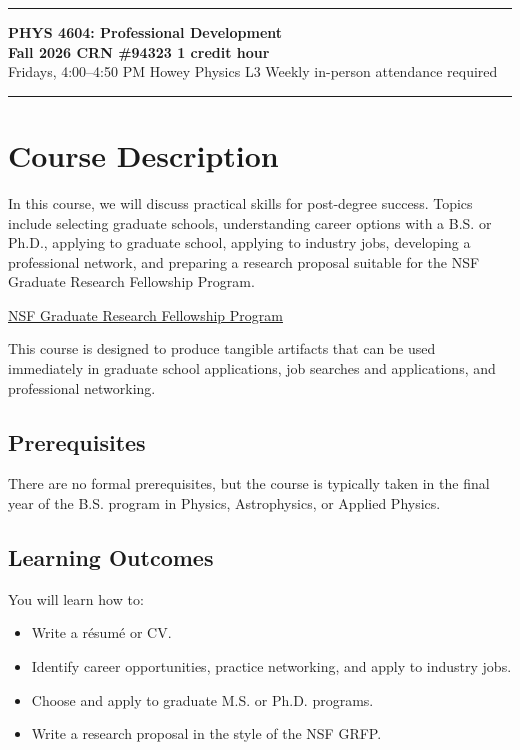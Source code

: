 \documentclass[11pt]{article}
\begin{document}
\noindent\textcolor{GTGold}{\rule{\textwidth}{4pt}}
\vspace{-0.2em}

\begingroup
\setlength{\fboxsep}{14pt}
\noindent\colorbox{GTLightGold}{%
\parbox{\dimexpr\textwidth-2\fboxsep\relax}{%
    {\LARGE\bfseries\textcolor{GTNavy}{PHYS 4604: Professional Development}}\\[0.45em]
    {\normalsize\bfseries Fall 2026 \textbar{} CRN \#94323 \textbar{} 1 credit hour}\\[0.25em]
    {\normalsize Fridays, 4:00--4:50 PM \textbullet{} Howey Physics L3 \textbullet{} Weekly in-person attendance required}
}}
\endgroup

\vspace{0.1em}
\noindent\textcolor{GTLightGray}{\rule{\textwidth}{0.5pt}}

\section*{Course Description}

In this course, we will discuss practical skills for post-degree success. Topics include selecting graduate schools, understanding career options with a B.S. or Ph.D., applying to graduate school, applying to industry jobs, developing a professional network, and preparing a research proposal suitable for the NSF Graduate Research Fellowship Program.

\href{https://www.nsfgrfp.org/}{NSF Graduate Research Fellowship Program}

This course is designed to produce tangible artifacts that can be used immediately in graduate school applications, job searches and applications, and professional networking.

\subsection*{Prerequisites}

There are no formal prerequisites, but the course is typically taken in the final year of the B.S. program in Physics, Astrophysics, or Applied Physics.

\subsection*{Learning Outcomes}

You will learn how to:
\begin{itemize}[nosep]
    \item Write a r\'esum\'e or CV.
    \item Identify career opportunities, practice networking, and apply to industry jobs.
    \item Choose and apply to graduate M.S. or Ph.D. programs.
    \item Write a research proposal in the style of the NSF GRFP.
\end{itemize}
\end{document}
